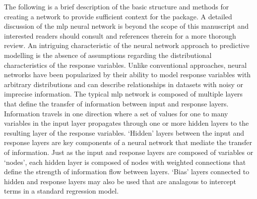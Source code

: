 \documentclass[article]{jss}\usepackage[]{graphicx}\usepackage[]{color}
\begin{document}
The following is a brief description of the basic structure and methods for creating a network to provide sufficient context for the  package.  A detailed discussion of the \ac{mlp} neural network is beyond the scope of this manuscript and interested readers should consult \citet{Rumelhart86,Ripley96} and references therein for a more thorough review.  An intriguing characteristic of the neural network approach to predictive modelling is the absence of assumptions regarding the distributional characteristics of the response variables.  Unlike conventional approaches, neural networks have been popularized by their ability to model response variables with arbitrary distributions and can describe relationships in datasets with noisy or imprecise information.  The typical \ac{mlp} network is composed of multiple layers that define the transfer of information between input and response layers.  Information travels in one direction where a set of values for one to many variables in the input layer propagates through one or more hidden layers to the resulting layer of the response variables. `Hidden' layers between the input and response layers are key components of a neural network that mediate the transfer of information.  Just as the input and response layers are composed of variables or `nodes', each hidden layer is composed of nodes with weighted connections that define the strength of information flow between layers.  `Bias' layers connected to hidden and response layers may also be used that are analagous to intercept terms in a standard regression model.
\end{document}
